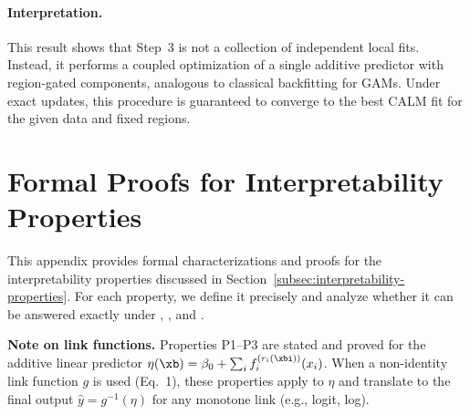 \paragraph{Interpretation.}
This result shows that Step~3 is not a collection of independent local fits.
Instead, it performs a coupled optimization of a single additive predictor with
region-gated components, analogous to classical backfitting for GAMs.
Under exact updates, this procedure is guaranteed to converge to the best CALM
fit for the given data and fixed regions.

\newpage
\section{Formal Proofs for Interpretability Properties}
\label{app:interpretability}

This appendix provides formal characterizations and proofs for the interpretability properties discussed in Section~\ref{subsec:interpretability-properties}. For each property, we define it precisely and analyze whether it can be answered exactly under  \gam, \gamm, and \method{}.

\textbf{Note on link functions.} Properties P1--P3 are stated and proved for the additive linear predictor $\eta(\xb) = \beta_0 + \sum_i f_i^{(r_i(\xbi))}(x_i)$. When a non-identity link function $g$ is used (Eq.~1), these properties apply to $\eta$ and translate to the final output $\hat{y} = g^{-1}(\eta)$ for any monotone link (e.g., logit, log).

